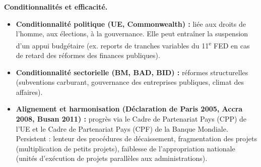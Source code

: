 \documentclass[11pt]{article}
\newcommand{\cle}[1]{{\popxbold\color{popdark}#1}}
\begin{document}
\textbf{Conditionnalités et efficacité.}
\begin{itemize}
    \item \textbf{Conditionnalité politique (UE, Commonwealth) :} liée aux droits de l'homme, aux élections, à la gouvernance. Elle peut entraîner la suspension d'un appui budgétaire (ex. reports de tranches variables du 11\textsuperscript{e} FED en cas de retard des réformes des finances publiques).
    \item \textbf{Conditionnalité sectorielle (BM, BAD, BID) :} réformes structurelles (subventions carburant, gouvernance des entreprises publiques, climat des affaires).
    \item \textbf{Alignement et harmonisation (Déclaration de Paris 2005, Accra 2008, Busan 2011) :} progrès via le \cle{Cadre de Partenariat Pays (CPP)} de l'UE et le \cle{Cadre de Partenariat Pays (CPF)} de la Banque Mondiale. Persistent : lenteur des procédures de décaissement, fragmentation des projets (multiplication de petits projets), faiblesse de l'appropriation nationale (unités d'exécution de projets parallèles aux administrations).
\end{itemize}
\end{document}
